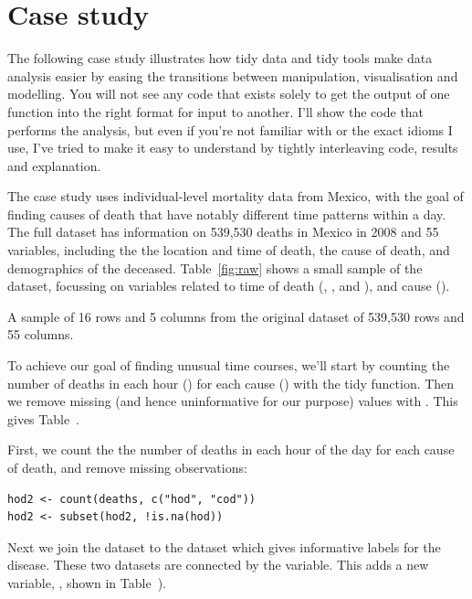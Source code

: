 \documentclass[article]{jss}
\begin{document}
\section{Case study} 
\label{sec:case-study}

The following case study illustrates how tidy data and tidy tools make data analysis easier by easing the transitions between manipulation, visualisation and modelling. You will not see any code that exists solely to get the output of one function into the right format for input to another. I'll show the  code that performs the analysis, but even if you're not familiar with  or the exact idioms I use, I've tried to make it easy to understand by tightly interleaving code, results and explanation.

The case study uses individual-level mortality data from Mexico, with the goal of finding causes of death that have notably different time patterns within a day. The full dataset has information on 539,530 deaths in Mexico in 2008 and 55 variables, including the the location and time of death, the cause of death, and demographics of the deceased. Table~\ref{fig:raw} shows a small sample of the dataset, focussing on variables related to time of death (, ,  and ), and cause ().

\begin{table}
  \centering
  
  \caption{A sample of 16 rows and 5 columns from the original dataset of 539,530 rows and 55 columns.}
  \label{fig:raw}
\end{table}

To achieve our goal of finding unusual time courses, we'll start by counting the number of deaths in each hour () for each cause () with the tidy  function. Then we remove missing (and hence uninformative for our purpose) values with . This gives Table~.

First, we count the the number of deaths in each hour of the day for each cause of death, and remove missing observations:

\begin{Verbatim}
hod2 <- count(deaths, c("hod", "cod"))
hod2 <- subset(hod2, !is.na(hod))
\end{Verbatim}

Next we join the dataset to the  dataset which gives informative labels for the disease. These two datasets are connected by the  variable. This adds a new variable, , shown in Table~).
\end{document}
